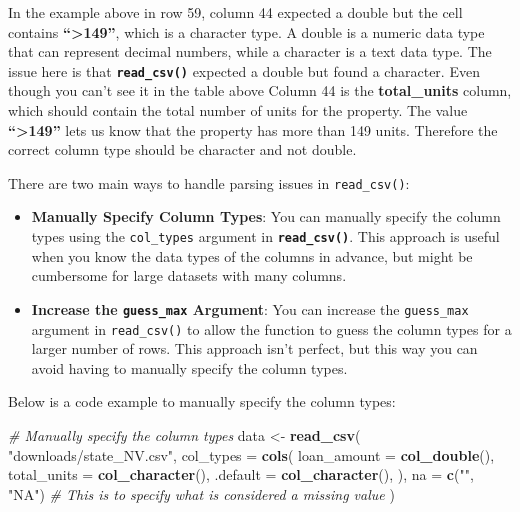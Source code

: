 \documentclass[
]{book}
\newenvironment{Shaded}{\begin{snugshade}}{\end{snugshade}}
\newcommand{\AttributeTok}[1]{\textcolor[rgb]{0.13,0.29,0.53}{#1}}
\newcommand{\CommentTok}[1]{\textcolor[rgb]{0.56,0.35,0.01}{\textit{#1}}}
\newcommand{\FunctionTok}[1]{\textcolor[rgb]{0.13,0.29,0.53}{\textbf{#1}}}
\newcommand{\NormalTok}[1]{#1}
\newcommand{\OtherTok}[1]{\textcolor[rgb]{0.56,0.35,0.01}{#1}}
\newcommand{\StringTok}[1]{\textcolor[rgb]{0.31,0.60,0.02}{#1}}
\providecommand{\tightlist}{%
  \setlength{\itemsep}{0pt}\setlength{\parskip}{0pt}}
\begin{document}
In the example above in row 59, column 44 expected a double but the cell contains \textbf{``\textgreater149''}, which is a character type. A double is a numeric data type that can represent decimal numbers, while a character is a text data type. The issue here is that \textbf{\texttt{read\_csv()}} expected a double but found a character. Even though you can't see it in the table above Column 44 is the \textbf{total\_units} column, which should contain the total number of units for the property. The value \textbf{``\textgreater149''} lets us know that the property has more than 149 units. Therefore the correct column type should be character and not double.

There are two main ways to handle parsing issues in \texttt{read\_csv()}:

\begin{itemize}
\tightlist
\item
  \textbf{Manually Specify Column Types}: You can manually specify the column types using the \texttt{col\_types} argument in \textbf{\texttt{read\_csv()}}. This approach is useful when you know the data types of the columns in advance, but might be cumbersome for large datasets with many columns.
\item
  \textbf{Increase the \texttt{guess\_max} Argument}: You can increase the \texttt{guess\_max} argument in \texttt{read\_csv()} to allow the function to guess the column types for a larger number of rows. This approach isn't perfect, but this way you can avoid having to manually specify the column types.
\end{itemize}

Below is a code example to manually specify the column types:

\begin{Shaded}
\begin{Highlighting}[]
\CommentTok{\# Manually specify the column types}
\NormalTok{data }\OtherTok{\textless{}{-}} \FunctionTok{read\_csv}\NormalTok{(}
  \StringTok{"downloads/state\_NV.csv"}\NormalTok{,}
  \AttributeTok{col\_types =} \FunctionTok{cols}\NormalTok{(}
    \AttributeTok{loan\_amount =} \FunctionTok{col\_double}\NormalTok{(),}
    \AttributeTok{total\_units =} \FunctionTok{col\_character}\NormalTok{(),}
    \AttributeTok{.default =} \FunctionTok{col\_character}\NormalTok{(),}
\NormalTok{  ),}
  \AttributeTok{na =} \FunctionTok{c}\NormalTok{(}\StringTok{""}\NormalTok{, }\StringTok{"NA"}\NormalTok{) }\CommentTok{\# This is to specify what is considered a missing value}
\NormalTok{  )}
\end{Highlighting}
\end{Shaded}
\end{document}
